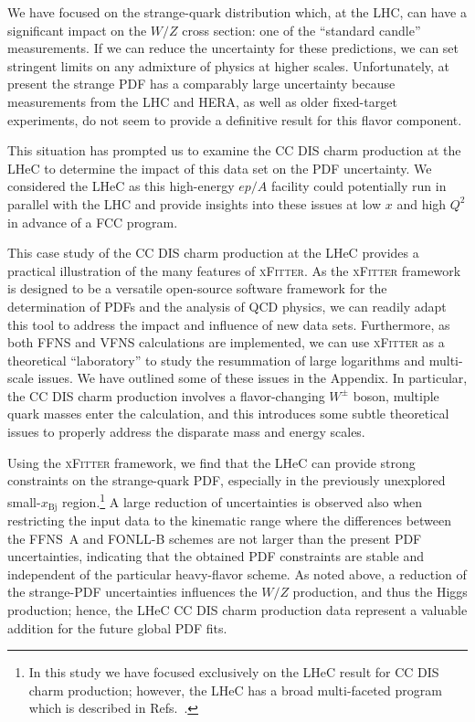\documentclass[pdftex,twocolumn,epjc3]{svjour3}          %
\newcommand{\xfitter} {\textsc{xFitter}\xspace}
\newcommand{\xbj}{\ensuremath{x_{\text{Bj}}}\xspace}
\newcommand{\fonll} {{FONLL-B}\xspace}
\newcommand{\ffns} {{FFNS~A}\xspace}
\newcommand\new[1]{{\color{blue} #1}}
\renewcommand\new[1]{{ #1}}
\begin{document}
%
%
We have focused on the  strange-quark distribution which,
at the LHC, can have a significant impact on the $W/Z$ cross section:
one of the ``standard candle'' measurements.
%
If we can reduce the uncertainty for these predictions, we can set
stringent limits on any admixture of physics at higher scales.
%
Unfortunately, at present the strange PDF has a comparably large uncertainty
because measurements from the LHC and HERA, as well as older
fixed-target experiments, do not seem to provide a definitive result
for this flavor component.

This situation  has  prompted us to examine the CC DIS charm production at
the LHeC to determine the impact of this data set on the PDF
uncertainty.
%
We considered the LHeC  as this  high-energy $ep/A$
facility  could potentially run in parallel with the LHC and
provide insights into these issues at low $x$ and high $Q^2$ in advance of a FCC program.



%
%
This case study of the CC DIS charm production at the LHeC provides a
practical illustration of the many features of \xfitter.
%
As the \xfitter framework is designed to be a versatile open-source
software framework for the determination of PDFs and the analysis of
QCD physics, we can readily adapt this tool to address the impact and
influence of new data sets.
%
Furthermore, as both FFNS and VFNS calculations are implemented, we
can use \xfitter as a theoretical ``laboratory'' to study the
resummation of large logarithms and multi-scale issues.
%
We have outlined some of these issues in the Appendix.
%
In particular, the CC DIS charm production involves a flavor-changing
$W^\pm$ boson, multiple quark masses enter the calculation, and this
introduces some subtle theoretical issues to properly address the
disparate mass and energy scales.





%
%
Using the \xfitter framework, 
we find that the LHeC can provide strong constraints on the
strange-quark PDF, especially in the previously unexplored small-\xbj
region.\footnote{In this study we have focused exclusively on the LHeC
  result for CC DIS charm production; however, the LHeC has a broad
  multi-faceted program which is described in
  Refs.~\cite{AbelleiraFernandez:2012ty,Klein:2018rhq}.}
%
\new{A large reduction of uncertainties is observed also when restricting 
the input data to the kinematic range where the differences between the \ffns and 
\fonll schemes are not larger than the present PDF uncertainties, indicating 
that the obtained  PDF constraints are stable and 
independent of the particular heavy-flavor scheme.}
As noted above, a reduction of the strange-PDF uncertainties
influences the $W/Z$ production, and thus the Higgs production; hence,
the LHeC CC DIS charm production data represent a valuable addition
for the future global PDF fits.
\end{document}

